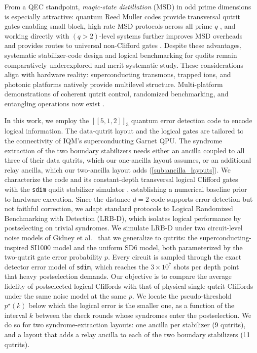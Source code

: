 From a QEC standpoint, \emph{magic-state distillation} (MSD) in odd prime dimensions is especially attractive: quantum Reed Muller codes provide transversal qutrit gates enabling small block, high rate MSD protocols across all prime \(q\) \cite{CampbellPRX2012}, and working directly with \((q>2)\)-level systems further improves MSD overheads and provides routes to universal non-Clifford gates \cite{CampbellPRL2014}. Despite these advantages, systematic stabilizer-code design and logical benchmarking for qudits remain comparatively underexplored and merit systematic study. These considerations align with hardware reality: superconducting transmons, trapped ions, and photonic platforms natively provide multilevel structure.  Multi-platform demonstrations of coherent qutrit control, randomized benchmarking, and entangling operations now exist \cite{Morvan2021,Ringbauer2022,Goss2024}.

In this work, we employ the $[[5,1,2]]_3$ quantum error detection code to encode logical information. The data-qutrit layout and the logical gates are tailored to the connectivity of IQM’s superconducting Garnet QPU.
The syndrome extraction of the two boundary stabilizers needs either an ancilla coupled to all three of their data qutrits, which our one-ancilla layout assumes, or an additional relay ancilla, which our two-ancilla layout adds (\autoref{sub:ancilla_layouts}). We characterize the code and its constant-depth transversal logical Clifford gates with the \texttt{sdim} qudit stabilizer simulator \cite{sdim}, establishing a numerical baseline prior to hardware execution. Since the distance $d=2$ code supports error detection but not faithful correction, we adapt standard protocols to Logical Randomized Benchmarking with Detection (LRB-D), which isolates logical performance by postselecting on trivial syndromes. We simulate LRB-D under two circuit-level noise models of Gidney et al.~\cite{GidneyHoneycomb2021} that we generalize to qutrits: the superconducting-inspired SI1000 model and the uniform SD6 model, both parameterized by the two-qutrit gate error probability $p$. Every circuit is sampled through the exact detector error model of \texttt{sdim}, which reaches the $3\times 10^{7}$ shots per depth point that heavy postselection demands. Our objective is to compare the average fidelity of postselected logical Cliffords with that of physical single-qutrit Cliffords under the same noise model at the same $p$. We locate the pseudo-threshold $p^\star(k)$ below which the logical error is the smaller one, as a function of the interval $k$ between the check rounds whose syndromes enter the postselection. We do so for two syndrome-extraction layouts: one ancilla per stabilizer (9 qutrits), and a layout that adds a relay ancilla to each of the two boundary stabilizers (11 qutrits).


